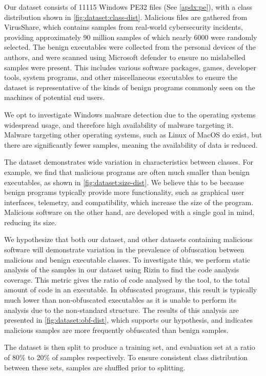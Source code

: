 \documentclass[conference,compsoc]{IEEEtran}
\begin{document}
Our dataset consists of 11115 Windows PE32 files (See \ref{apdx:pe}), with a class distribution shown in \ref{fig:dataset:class-dist}. Malicious files are gathered from VirusShare, which contains samples from real-world cybersecurity incidents, providing approximately 90 million samples of which nearly 6000 were randomly selected. The benign executables were collected from the personal devices of the authors, and were scanned using Microsoft defender to ensure no mislabelled samples were present. This includes various software packages, games, developer tools, system programs, and other miscellaneous executables to ensure the dataset is representative of the kinds of benign programs commonly seen on the machines of potential end users.

We opt to investigate Windows malware detection due to the operating systems widespread usage, and therefore high availability of malware targeting it. Malware targeting other operating systems, such as Linux of MacOS do exist, but there are significantly fewer samples, meaning the availability of data is reduced.

The dataset demonstrates wide variation in characteristics between classes. For example, we find that malicious programs are often much smaller than benign executables, as shown in \ref{fig:dataset:size-dist}. We believe this to be because benign programs typically provide more functionality, such as graphical user interfaces, telemetry, and compatibility, which increase the size of the program. Malicious software on the other hand, are developed with a single goal in mind, reducing its size.

We hypothesize that both our dataset, and other datasets containing malicious software will demonstrate variation in the prevalence of obfuscation between malicious and benign executable classes. To investigate this, we perform static analysis of the samples in our dataset using Rizin \cite{rizinorganizationRizin2025} to find the code analysis coverage. This metric gives the ratio of code analysed by the tool, to the total amount of code in an executable. In obfuscated programs, this result is typically much lower than non-obfuscated executables as it is unable to perform its analysis due to the non-standard structure. The results of this analysis are presented in \ref{fig:dataset:obf-dist}, which supports our hypothesis, and indicates malicious samples are more frequently obfuscated than benign samples.  

The dataset is then split to produce a training set, and evaluation set at a ratio of 80\% to 20\% of samples respectively. To ensure consistent class distribution between these sets, samples are shuffled prior to splitting. 
\end{document}
